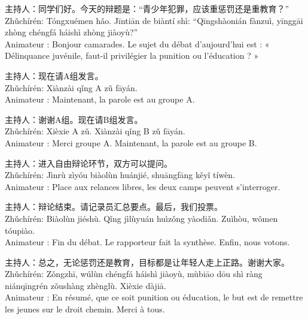 \documentclass[11pt]{article}
\begin{document}
\begin{textebox}
主持人：同学们好。今天的辩题是：“青少年犯罪，应该重惩罚还是重教育？”\\
Zhǔchírén: Tóngxuémen hǎo. Jīntiān de biàntí shì: ``Qīngshàonián fànzuì, yīnggāi zhòng chéngfá háishì zhòng jiàoyù?''\\
Animateur : Bonjour camarades. Le sujet du débat d'aujourd'hui est : « Délinquance juvénile, faut-il privilégier la punition ou l'éducation ? »

主持人：现在请A组发言。\\
Zhǔchírén: Xiànzài qǐng A zǔ fāyán.\\
Animateur : Maintenant, la parole est au groupe A.

主持人：谢谢A组。现在请B组发言。\\
Zhǔchírén: Xièxie A zǔ. Xiànzài qǐng B zǔ fāyán.\\
Animateur : Merci groupe A. Maintenant, la parole est au groupe B.

主持人：进入自由辩论环节，双方可以提问。\\
Zhǔchírén: Jìnrù zìyóu biàolùn huánjié, shuāngfāng kěyǐ tíwèn.\\
Animateur : Place aux relances libres, les deux camps peuvent s'interroger.

主持人：辩论结束。请记录员汇总要点。最后，我们投票。\\
Zhǔchírén: Biàolùn jiéshù. Qǐng jìlùyuán huìzǒng yàodiǎn. Zuìhòu, wǒmen tóupiào.\\
Animateur : Fin du débat. Le rapporteur fait la synthèse. Enfin, nous votons.

主持人：总之，无论惩罚还是教育，目标都是让年轻人走上正路。谢谢大家。\\
Zhǔchírén: Zǒngzhī, wúlùn chéngfá háishì jiàoyù, mùbiāo dōu shì ràng niánqīngrén zǒushàng zhènglù. Xièxie dàjiā.\\
Animateur : En résumé, que ce soit punition ou éducation, le but est de remettre les jeunes sur le droit chemin. Merci à tous.
\end{textebox}
\end{document}
